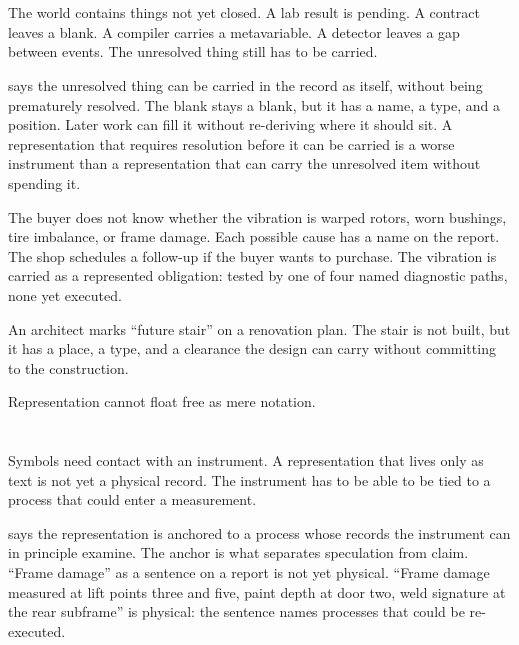 \section{}
\label{se:representable}

The world contains things not yet closed. A lab result is pending. A
contract leaves a blank. A compiler carries a metavariable. A detector
leaves a gap between events. The unresolved thing still has to be carried.

 says the unresolved thing can be carried in the
record as itself, without being prematurely resolved. The blank stays a
blank, but it has a name, a type, and a position. Later work can fill it
without re-deriving where it should sit. A representation that requires
resolution before it can be carried is a worse instrument than a
representation that can carry the unresolved item without spending it.

The buyer does not know whether the vibration is warped rotors, worn
bushings, tire imbalance, or frame damage. Each possible cause has a name
on the report. The shop schedules a follow-up if the buyer wants to
purchase. The vibration is carried as a represented obligation: tested by
one of four named diagnostic paths, none yet executed.

An architect marks ``future stair'' on a renovation plan. The stair is not
built, but it has a place, a type, and a clearance the design can carry
without committing to the construction.

Representation cannot float free as mere notation.

\section{}
\label{se:physical}

Symbols need contact with an instrument. A representation that lives only
as text is not yet a physical record. The instrument has to be able to be
tied to a process that could enter a measurement.

 says the representation is anchored to a process whose
records the instrument can in principle examine. The anchor is what
separates speculation from claim. ``Frame damage'' as a sentence on a
report is not yet physical. ``Frame damage measured at lift points three
and five, paint depth at door two, weld signature at the rear subframe''
is physical: the sentence names processes that could be re-executed.

